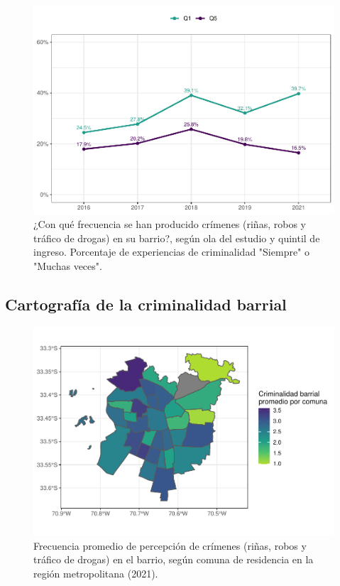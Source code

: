 \documentclass[
  12pt,
]{book}
\begin{document}
\begin{figure}

{\centering \includegraphics{reporte-elsoc_files/figure-latex/crim-quintil-1} 

}

\caption{¿Con qué frecuencia se han producido crímenes (riñas, robos y tráfico de drogas) en su barrio?, según ola del estudio y quintil de ingreso. Porcentaje de experiencias de criminalidad "Siempre" o "Muchas veces".}\label{fig:crim-quintil}
\end{figure}

\hypertarget{cartografuxeda-de-la-criminalidad-barrial}{%
\subsection{Cartografía de la criminalidad barrial}\label{cartografuxeda-de-la-criminalidad-barrial}}

\begin{figure}

{\centering \includegraphics{reporte-elsoc_files/figure-latex/crimi-comuna-1} 

}

\caption{Frecuencia promedio de percepción de crímenes (riñas, robos y tráfico de drogas) en el barrio, según comuna de residencia en la región metropolitana (2021).}\label{fig:crimi-comuna}
\end{figure}
\end{document}
